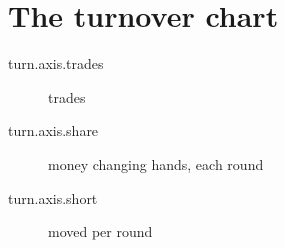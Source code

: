 \section{The turnover chart}


\begin{description}
  \item[turn.axis.trades] trades
  \item[turn.axis.share] money changing hands, each round
  \item[turn.axis.short] moved per round
\end{description}
